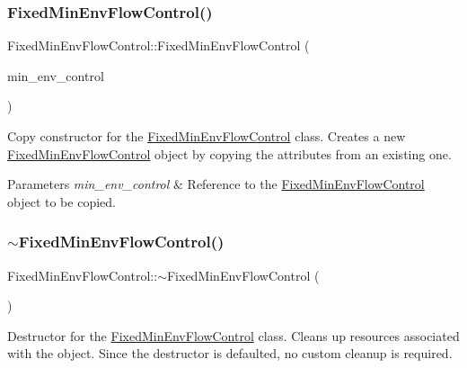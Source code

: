 \subsubsection{\texorpdfstring{Fixed\+Min\+Env\+Flow\+Control()}{FixedMinEnvFlowControl()}\hspace{0.1cm}{\footnotesize\ttfamily [2/2]}}
{\footnotesize\ttfamily Fixed\+Min\+Env\+Flow\+Control\+::\+Fixed\+Min\+Env\+Flow\+Control (\begin{DoxyParamCaption}\item[{const \mbox{\hyperlink{classFixedMinEnvFlowControl}{Fixed\+Min\+Env\+Flow\+Control}} \&}]{min\+\_\+env\+\_\+control }\end{DoxyParamCaption})}



Copy constructor for the {\ttfamily \mbox{\hyperlink{classFixedMinEnvFlowControl}{Fixed\+Min\+Env\+Flow\+Control}}} class. Creates a new {\ttfamily \mbox{\hyperlink{classFixedMinEnvFlowControl}{Fixed\+Min\+Env\+Flow\+Control}}} object by copying the attributes from an existing one. 


\begin{DoxyParams}{Parameters}
{\em min\+\_\+env\+\_\+control} & Reference to the {\ttfamily \mbox{\hyperlink{classFixedMinEnvFlowControl}{Fixed\+Min\+Env\+Flow\+Control}}} object to be copied. \\
\hline
\end{DoxyParams}
\mbox{\label{classFixedMinEnvFlowControl_ac63298347dcaccf755ea45d1e2f94bad}} 
\subsubsection{\texorpdfstring{$\sim$\+Fixed\+Min\+Env\+Flow\+Control()}{~FixedMinEnvFlowControl()}}
{\footnotesize\ttfamily Fixed\+Min\+Env\+Flow\+Control\+::$\sim$\+Fixed\+Min\+Env\+Flow\+Control (\begin{DoxyParamCaption}{ }\end{DoxyParamCaption})\hspace{0.3cm}{\ttfamily [override]}}



Destructor for the {\ttfamily \mbox{\hyperlink{classFixedMinEnvFlowControl}{Fixed\+Min\+Env\+Flow\+Control}}} class. Cleans up resources associated with the object. Since the destructor is defaulted, no custom cleanup is required. 

